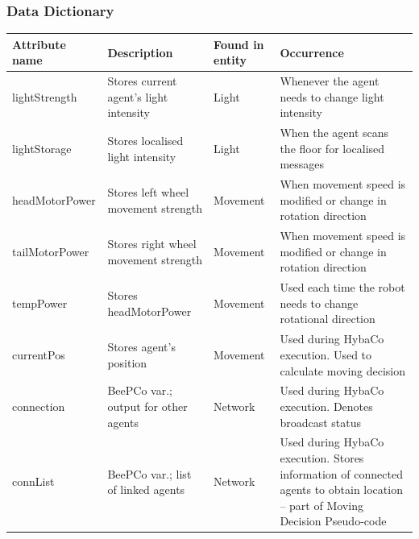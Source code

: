 \begin{landscape}
\subsubsection{Data Dictionary}
\begin{tabular}{| p{5cm} | p{4cm} | p{3cm} | p{6cm} |}
  \hline
  Attribute name & Description & Found in entity & Occurrence\\
  \hline
  lightStrength  & Stores current agent's light intensity & Light    &
    Whenever the agent needs to change light intensity              \\
  \hline
  lightStorage   & Stores localised light intensity       & Light    &
    When the agent scans the floor for localised messages           \\
  \hline
  headMotorPower & Stores left wheel movement strength    & Movement &
    When movement speed is modified or change in rotation direction \\
  \hline
  tailMotorPower & Stores right wheel movement strength   & Movement &
    When movement speed is modified or change in rotation direction \\
  \hline
  tempPower      & Stores headMotorPower                  & Movement &
    Used each time the robot needs to change rotational direction   \\
  \hline
  currentPos     & Stores agent's position                & Movement &
    Used during HybaCo execution.  Used to calculate moving decision\\
  \hline
  connection     & BeePCo var.; output for other agents   & Network  &
    Used during HybaCo execution.   Denotes broadcast status        \\
  \hline
  connList       & BeePCo var.; list of linked agents     & Network  &
    Used during HybaCo execution.  Stores information of connected
    agents to obtain location -- part of Moving Decision Pseudo-code\\
  \hline  
\end{tabular}
\end{landscape}
\clearpage

